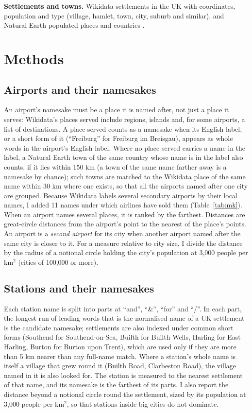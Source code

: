 \documentclass[11pt,a4paper]{article}
\begin{document}
\textbf{Settlements and towns.} Wikidata settlements in the UK with coordinates, population and type (village, hamlet, town, city, suburb and similar), and Natural Earth populated places and countries \citep{naturalearth}.

\section{Methods}
\subsection{Airports and their namesakes}
An airport's namesake must be a place it is named after, not just a place it serves: Wikidata's places served include regions, islands and, for some airports, a list of destinations. A place served counts as a namesake when its English label, or a short form of it (``Freiburg'' for Freiburg im Breisgau), appears as whole words in the airport's English label. Where no place served carries a name in the label, a Natural Earth town of the same country whose name is in the label also counts, if it lies within 150 km (a town of the same name farther away is a namesake by chance); such towns are matched to the Wikidata place of the same name within 30 km where one exists, so that all the airports named after one city are grouped. Because Wikidata labels several secondary airports by their local names, I added 11 names under which airlines have sold them (Table~\ref{tab:mk}). When an airport names several places, it is ranked by the farthest. Distances are great-circle distances from the airport's point to the nearest of the place's points. An airport is a \emph{second airport} for its city when another airport named after the same city is closer to it. For a measure relative to city size, I divide the distance by the radius of a notional circle holding the city's population at 3,000 people per km$^2$ (cities of 100,000 or more).

\subsection{Stations and their namesakes}
Each station name is split into parts at ``and'', ``\&'', ``for'' and ``/''. In each part, the longest run of leading words that is the normalised name of a UK settlement is the candidate namesake; settlements are also indexed under common short forms (Southend for Southend-on-Sea, Builth for Builth Wells, Harling for East Harling, Burton for Burton upon Trent), which are used only if they are more than 5 km nearer than any full-name match. Where a station's whole name is itself a village that grew round it (Builth Road, Clarbeston Road), the village named in it is also looked for. The station is measured to the nearest settlement of that name, and its namesake is the farthest of its parts. I also report the distance beyond a notional circle round the settlement, sized by its population at 3,000 people per km$^2$, so that stations inside big cities do not dominate.
\end{document}

